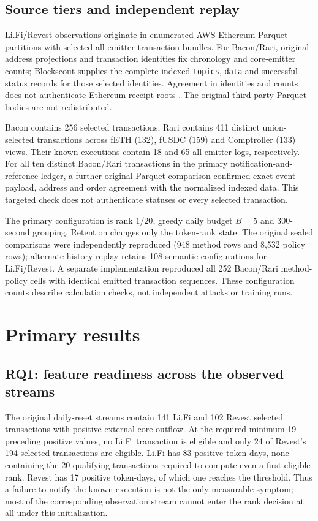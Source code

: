 \documentclass[preprint,12pt,authoryear]{elsarticle}
\begin{document}
\subsection{Source tiers and independent replay}
Li.Fi/Revest observations originate in enumerated AWS Ethereum Parquet partitions with selected all-emitter transaction bundles. For Bacon/Rari, original address projections and transaction identities fix chronology and core-emitter counts; Blockscout supplies the complete indexed \texttt{topics}, \texttt{data} and successful-status records for those selected identities. Agreement in identities and counts does not authenticate Ethereum receipt roots \citep{AWS2026Dataset}. The original third-party Parquet bodies are not redistributed.

Bacon contains 256 selected transactions; Rari contains 411 distinct union-selected transactions across fETH (132), fUSDC (159) and Comptroller (133) views. Their known executions contain 18 and 65 all-emitter logs, respectively. For all ten distinct Bacon/Rari transactions in the primary notification-and-reference ledger, a further original-Parquet comparison confirmed exact event payload, address and order agreement with the normalized indexed data. This targeted check does not authenticate statuses or every selected transaction.

The primary configuration is rank $1/20$, greedy daily budget $B=5$ and 300-second grouping. Retention changes only the token-rank state. The original sealed comparisons were independently reproduced (948 method rows and 8,532 policy rows); alternate-history replay retains 108 semantic configurations for Li.Fi/Revest. A separate implementation reproduced all 252 Bacon/Rari method-policy cells with identical emitted transaction sequences. These configuration counts describe calculation checks, not independent attacks or training runs.

\section{Primary results}\label{sec:results}
\subsection{RQ1: feature readiness across the observed streams}
The original daily-reset streams contain 141 Li.Fi and 102 Revest selected transactions with positive external core outflow. At the required minimum 19 preceding positive values, no Li.Fi transaction is eligible and only 24 of Revest's 194 selected transactions are eligible. Li.Fi has 83 positive token-days, none containing the 20 qualifying transactions required to compute even a first eligible rank. Revest has 17 positive token-days, of which one reaches the threshold. Thus a failure to notify the known execution is not the only measurable symptom; most of the corresponding observation stream cannot enter the rank decision at all under this initialization.
\end{document}
